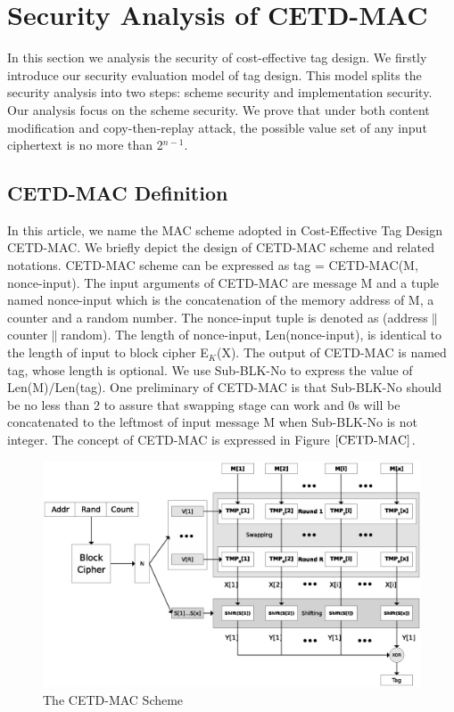 

\section{Security Analysis of CETD-MAC}
In this section we analysis the security of cost-effective tag design. We firstly introduce our security evaluation model of tag design. This model splits the security analysis into two steps: scheme security and implementation security. Our analysis focus on the scheme security. We prove that under both content modification and copy-then-replay attack, the possible value set of any input ciphertext is no more than 2$^{n-1}$.
\subsection{CETD-MAC Definition}
In this article, we name the MAC scheme adopted in Cost-Effective Tag Design\cite{} CETD-MAC. We briefly depict the design of CETD-MAC scheme and related notations.
CETD-MAC scheme can be expressed as tag = CETD-MAC(M, nonce-input). The input arguments of CETD-MAC are message M and a tuple named nonce-input which is the concatenation of the memory address of M, a counter and a random number. The nonce-input tuple is denoted as (address$\|$counter$\|$random). The length of nonce-input, Len(nonce-input), is identical to the length of input to block cipher E$_K$(X). The output of CETD-MAC is named tag, whose length is optional. We use Sub-BLK-No to express the value of Len(M)/Len(tag). One preliminary of CETD-MAC is that Sub-BLK-No should be no less than 2 to assure that swapping stage can work and 0s will be concatenated to the leftmost of input message M when Sub-BLK-No is not integer.  
The concept of CETD-MAC is expressed in Figure $\ref{CETD-MAC}$.
\begin{figure}[htbp]
 \centering
 \includegraphics[scale=0.6]{./diagrams/CETD.eps}
 \caption{The CETD-MAC Scheme}
 \label{fig:CETD-MAC}
\end{figure}

